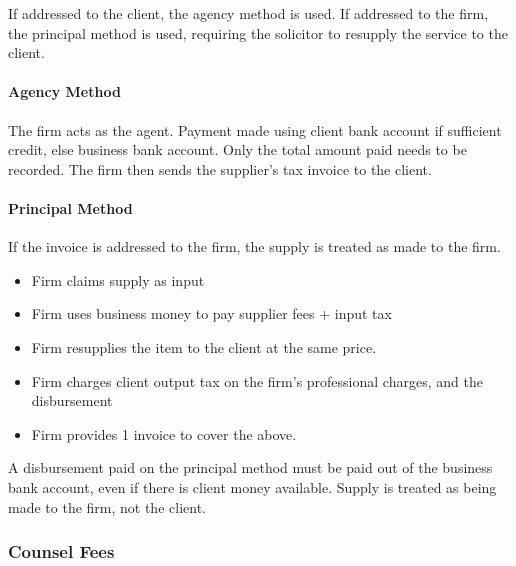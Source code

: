\documentclass[
]{article}
\newenvironment{Shaded}{}{}
\newcommand{\NormalTok}[1]{#1}
\providecommand{\tightlist}{%
  \setlength{\itemsep}{0pt}\setlength{\parskip}{0pt}}
\begin{document}
If addressed to the client, the agency method is used. If addressed to
the firm, the principal method is used, requiring the solicitor to
resupply the service to the client.

\hypertarget{agency-method}{%
\paragraph{Agency Method}\label{agency-method}}

The firm acts as the agent. Payment made using client bank account if
sufficient credit, else business bank account. Only the total amount
paid needs to be recorded. The firm then sends the supplier's tax
invoice to the client.

\hypertarget{principal-method}{%
\paragraph{Principal Method}\label{principal-method}}

If the invoice is addressed to the firm, the supply is treated as made
to the firm.

\begin{itemize}
\tightlist
\item
  Firm claims supply as input
\item
  Firm uses business money to pay supplier fees + input tax
\item
  Firm resupplies the item to the client at the same price.
\item
  Firm charges client output tax on the firm's professional charges, and
  the disbursement
\item
  Firm provides 1 invoice to cover the above.
\end{itemize}

\begin{Shaded}
\begin{Highlighting}[]
\NormalTok{A disbursement paid on the principal method must be paid out of the business bank account, even if there is client money available. Supply is treated as being made to the firm, not the client. }
\end{Highlighting}
\end{Shaded}

\hypertarget{counsel-fees}{%
\subsubsection{Counsel Fees}\label{counsel-fees}}
\end{document}
